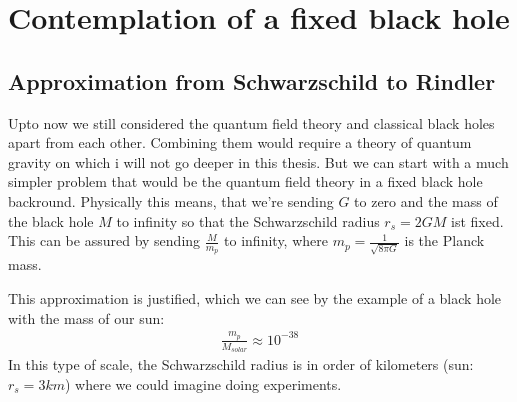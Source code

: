\section{Contemplation of a fixed black hole}

\subsection{Approximation from Schwarzschild to Rindler}
Upto now we still considered the quantum field theory and classical black holes apart from each other. Combining them would require a theory of quantum gravity on which i will not go deeper in this thesis. But we can start with a much simpler problem that would be the quantum field theory in a fixed black hole backround. Physically this means, that we're sending $G$ to zero and the mass of the black hole $M$ to infinity so that the Schwarzschild radius $r_s = 2GM$ ist fixed. This can be assured by sending $\frac{M}{m_p}$ to infinity, where $m_p =\frac{1}{\sqrt{8\pi G}}$ is the Planck mass. 

This approximation is justified, which we can see by the example of a black hole with the mass of our sun:
	\begin{align}
		\frac{m_p}{M_{solar}} \approx 10^{-38}
	\end{align}	 
In this type of scale, the Schwarzschild radius is in order of kilometers (sun: $r_s=3 \unit{km}$) where we could imagine doing experiments. 


